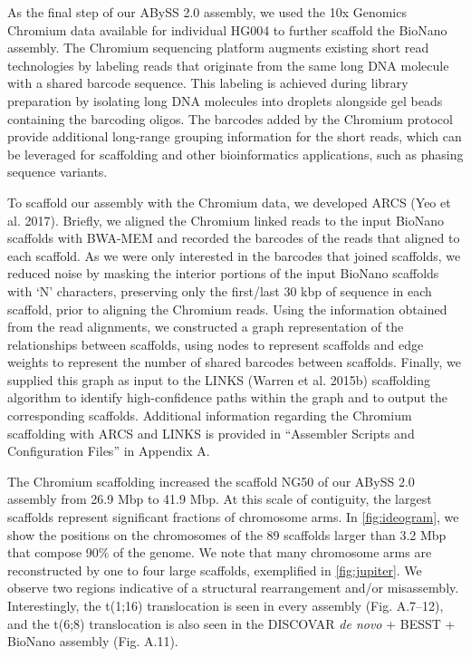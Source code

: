 \documentclass[
  12pt,
  oneside,
  openany]{book}
\begin{document}
As the final step of our ABySS 2.0 assembly, we used the 10x Genomics Chromium data available for individual HG004 to further scaffold the BioNano assembly. The Chromium sequencing platform augments existing short read technologies by labeling reads that originate from the same long DNA molecule with a shared barcode sequence. This labeling is achieved during library preparation by isolating long DNA molecules into droplets alongside gel beads containing the barcoding oligos. The barcodes added by the Chromium protocol provide additional long-range grouping information for the short reads, which can be leveraged for scaffolding and other bioinformatics applications, such as phasing sequence variants.

To scaffold our assembly with the Chromium data, we developed ARCS (Yeo et al. 2017). Briefly, we aligned the Chromium linked reads to the input BioNano scaffolds with BWA-MEM and recorded the barcodes of the reads that aligned to each scaffold. As we were only interested in the barcodes that joined scaffolds, we reduced noise by masking the interior portions of the input BioNano scaffolds with `N' characters, preserving only the first/last 30 kbp of sequence in each scaffold, prior to aligning the Chromium reads. Using the information obtained from the read alignments, we constructed a graph representation of the relationships between scaffolds, using nodes to represent scaffolds and edge weights to represent the number of shared barcodes between scaffolds. Finally, we supplied this graph as input to the LINKS (Warren et al. 2015b) scaffolding algorithm to identify high-confidence paths within the graph and to output the corresponding scaffolds. Additional information regarding the Chromium scaffolding with ARCS and LINKS is provided in ``Assembler Scripts and Configuration Files'' in Appendix A.

The Chromium scaffolding increased the scaffold NG50 of our ABySS 2.0 assembly from 26.9 Mbp to 41.9 Mbp. At this scale of contiguity, the largest scaffolds represent significant fractions of chromosome arms. In \cref{fig:ideogram}, we show the positions on the chromosomes of the 89 scaffolds larger than 3.2 Mbp that compose 90\% of the genome. We note that many chromosome arms are reconstructed by one to four large scaffolds, exemplified in \cref{fig:jupiter}. We observe two regions indicative of a structural rearrangement and/or misassembly. Interestingly, the t(1;16) translocation is seen in every assembly (Fig. A.7--12), and the t(6;8) translocation is also seen in the DISCOVAR \emph{de novo} + BESST + BioNano assembly (Fig. A.11).
\end{document}
